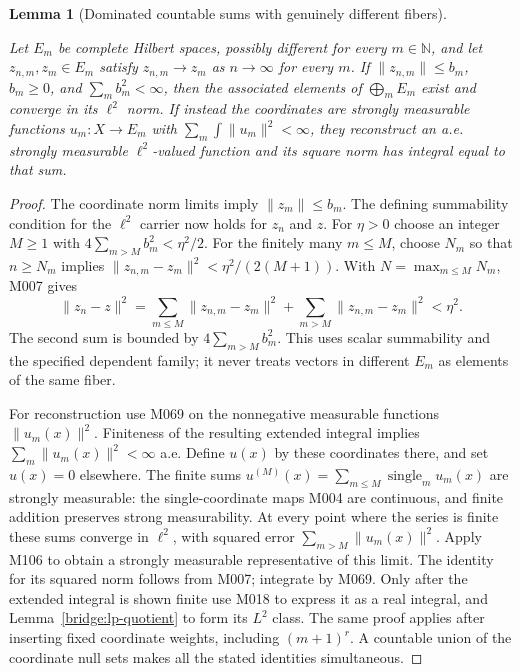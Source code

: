 \documentclass[11pt,a4paper]{article}
\newtheorem{lemma}[theorem]{Lemma}
\theoremstyle{definition}
\theoremstyle{remark}
\newcommand{\proofid}[1]{\par\smallskip{\normalfont\scriptsize\color{inkblue}Stable ID: \nolinkurl{#1}}\par\smallskip}
\begin{document}
\begin{lemma}[Dominated countable sums with genuinely different fibers]
\label{bridge:series-domination}
\proofid{bridge:series-domination}
\par{}\par\smallskip
Let $E_m$ be complete Hilbert spaces, possibly different for every
$m\in\mathbb N$, and let $z_{n,m},z_m\in E_m$ satisfy
$z_{n,m}\to z_m$ as $n\to\infty$ for every $m$.
If $\|z_{n,m}\|\leq b_m$, $b_m\geq0$, and $\sum_m b_m^2<\infty$,
then the associated elements of $\bigoplus_m E_m$ exist and converge
in its $\ell^2$ norm. If instead the coordinates are strongly measurable
functions $u_m:X\to E_m$ with
$\sum_m\int\|u_m\|^2<\infty$, they reconstruct an a.e. strongly measurable
$\ell^2$-valued function and its square norm has integral equal to that
sum.
\end{lemma}
\begin{proof}
The coordinate norm limits imply $\|z_m\|\leq b_m$. The defining
summability condition for the $\ell^2$ carrier now holds for $z_n$ and
$z$. For $\eta>0$ choose an integer $M\geq1$ with
$4\sum_{m>M}b_m^2<\eta^2/2$. For the finitely many $m\leq M$, choose
$N_m$ so that $n\geq N_m$ implies
$\|z_{n,m}-z_m\|^2<\eta^2/(2(M+1))$. With
$N=\max_{m\leq M}N_m$, M007 gives
\[
 \|z_n-z\|^2
 =\sum_{m\leq M}\|z_{n,m}-z_m\|^2+
   \sum_{m>M}\|z_{n,m}-z_m\|^2<\eta^2.
\]
The second sum is bounded by $4\sum_{m>M}b_m^2$. This uses scalar
summability and the specified dependent family; it never treats
vectors in different $E_m$ as elements of the same fiber.

For reconstruction use M069 on the nonnegative measurable functions
$\|u_m(x)\|^2$. Finiteness of the resulting extended integral implies
$\sum_m\|u_m(x)\|^2<\infty$ a.e. Define $u(x)$ by these coordinates
there, and set $u(x)=0$ elsewhere. The finite sums
$u^{(M)}(x)=\sum_{m\leq M}\operatorname{single}_m u_m(x)$
are strongly measurable: the single-coordinate maps M004 are continuous,
and finite addition preserves strong measurability. At every point
where the series is finite these sums converge in $\ell^2$, with squared
error $\sum_{m>M}\|u_m(x)\|^2$. Apply M106 to obtain a strongly measurable
representative of this limit. The identity for its squared norm follows
from M007; integrate by M069. Only after the extended integral is shown
finite use M018 to express it as a real integral, and
Lemma~\ref{bridge:lp-quotient} to form its $L^2$ class.
The same proof applies after inserting fixed coordinate weights,
including $(m+1)^r$. A countable union of the coordinate null sets makes
all the stated identities simultaneous.
\end{proof}
\end{document}
